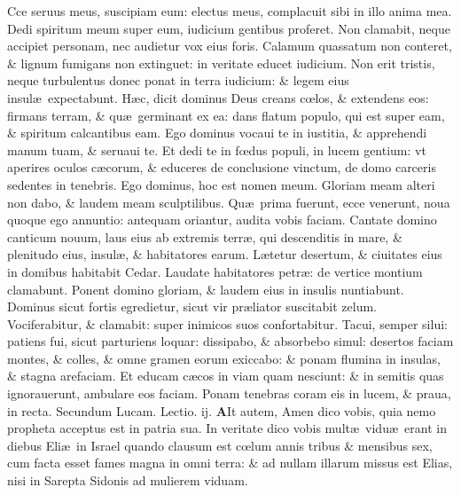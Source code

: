 \documentclass[a5paper,10pt]{book}
\def\leftmarginnote{%
	\lrmarginnote{\hskip -\marginparsep \hskip -6.5em}}
\def\rightmarginnote{%
	\lrmarginnote{\hskip\columnwidth \hskip -1em}}
\def\ae{æ}
\def\oe{œ}
\begin{document}
\begin{multicols*}{2}
\vspace{-.25em}
Cce\leftmarginnote{\begin{flushright}c. 42.\end{flushright}} seruus meus, suscipiam eum: electus meus, complacuit sibi in illo anima mea.
Dedi spiritum meum super eum, iudicium gentibus proferet.
Non clamabit, neque accipiet personam, nec audietur vox eius foris.
Calamum quassatum non conteret, \& lignum fumigans non extinguet: in veritate educet iudicium.
Non erit tristis, neque turbulentus donec ponat in terra iudicium: \& legem eius insul\ae \ expectabunt.
H\ae c, dicit dominus Deus creans c\oe los, \& extendens eos: firmans terram, \& qu\ae \ germinant ex ea: dans flatum populo, qui est super eam, \& spiritum calcantibus eam.
Ego dominus vocaui te in iustitia, \& apprehendi manum tuam, \& seruaui te.
Et dedi te in f\oe dus populi, in lucem gentium: vt aperires oculos c\ae corum, \& educeres de conclusione vinctum, de domo carceris sedentes in tenebris.
Ego dominus, hoc est nomen meum. Gloriam meam alteri non dabo, \& laudem meam sculptilibus.
Qu\ae \ prima fuerunt, ecce
venerunt, noua quoque ego annuntio: antequam oriantur, audita vobis faciam.
Cantate domino canticum nouum, laus eius ab extremis terr\ae , qui descenditis in mare, \& plenitudo eius, insul\ae , \& habitatores earum.
L\ae tetur desertum, \& ciuitates eius in domibus habitabit Cedar.
Laudate habitatores petr\ae : de vertice montium clamabunt.
Ponent domino gloriam, \& laudem eius in insulis nuntiabunt.
Dominus sicut fortis egredietur, sicut vir pr\ae liator suscitabit zelum.
Vociferabitur, \& clamabit: super inimicos suos confortabitur.
Tacui, semper silui: patiens fui, sicut parturiens loquar: dissipabo, \& absorbebo simul: desertos faciam montes, \& colles, \& omne gramen eorum exiccabo: \& ponam flumina in insulas, \& stagna arefaciam.
Et educam c\ae cos in viam quam nesciunt: \& in semitis quas ignorauerunt, ambulare eos faciam.
Ponam tenebras coram eis in lucem, \& praua, in recta.
\fancyhead[C]{\color{red} Feria. iij. Dominic\ae . ij. aduentus}
\newline \color{red} Secundum Lucam. \hfill Lectio. ij. \color{black}
\vspace{-.25em}
\lettrine[lines=2]{\bfseries \color{red} A}{}It\rightmarginnote{c.4.c} autem, Amen dico vobis, quia nemo propheta acceptus est in patria sua.
In veritate dico vobis mult\ae \ vidu\ae \ erant in diebus Eli\ae \ in Israel quando clausum est c\oe lum annis tribus \& mensibus sex, cum facta esset fames magna in omni terra: \& ad nullam illarum missus est Elias, nisi in Sarepta Sidonis ad mulierem viduam.

\end{multicols*}
\end{document}
